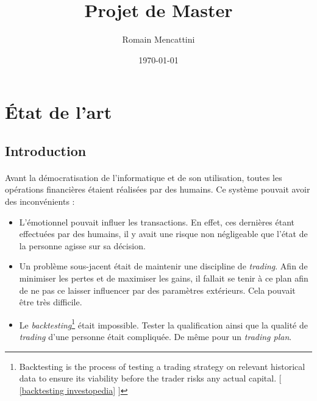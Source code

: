 \documentclass[a4paper, 11pt]{article}
\title{Projet de Master}
\author{Romain Mencattini}
\date{\today}
\begin{document}
\maketitle
\newpage
\tableofcontents
\newpage

\section{État de l'art}
\subsection{Introduction}
\paragraph{}
Avant la démocratisation de l'informatique et de son utilisation, toutes les opérations financières étaient réalisées par des humains. Ce système pouvait avoir des inconvénients :
\begin{itemize}
\item L'émotionnel pouvait influer les transactions. En effet, ces dernières étant effectuées par des humains, il y avait une risque non négligeable que l'état de la personne agisse sur sa décision.
\item Un problème sous-jacent était de maintenir une discipline de \textit{trading}. Afin de minimiser les pertes et de maximiser les gains, il fallait se tenir à ce plan afin de ne pas ce laisser influencer par des paramètres extérieurs. Cela pouvait être très difficile.
\item Le \textit{backtesting}\footnote{Backtesting is the process of testing a trading strategy on relevant historical data to ensure its viability before the trader risks any actual capital. $[$ \ref{backtesting investopedia} $]$} était impossible. Tester la qualification ainsi que la qualité de \textit{trading} d'une personne était compliquée. De même pour un \textit{trading plan}.
\end{itemize}
\end{document}
